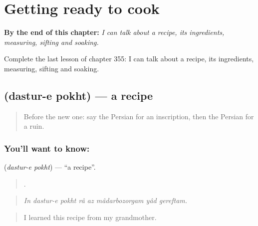 
\chapter{Getting ready to cook}
\label{ch:fa-getting-ready-to-cook}

\begin{chapteropening}
\textbf{By the end of this chapter:} \emph{I can talk about a recipe, its ingredients, measuring, sifting and soaking.}

Complete the last lesson of chapter 355: I can talk about a recipe, its ingredients, measuring, sifting and soaking.
\end{chapteropening}

\section[\texorpdfstring{\fa{دستور} \fa{پخت} (dastur-e pokht)}{دستور پخت (dastur-e pokht)}]{  (dastur-e pokht) — a recipe}

\label{lesson:FA-C355-dastur-e-pokht}



\begin{quote}
Before the new one: say the Persian for an inscription, then the Persian for a ruin.
\end{quote}

\subsection*{You'll want to know:  }
\textbf{ } (\emph{dastur-e pokht}) — \textquotedblleft{}a recipe\textquotedblright{}.

\begin{quote}
       .
\end{quote}

\begin{quote}
\emph{In dastur-e pokht râ az mâdarbozorgam yâd gereftam.}
\end{quote}

\begin{quote}
I learned this recipe from my grandmother.
\end{quote}


